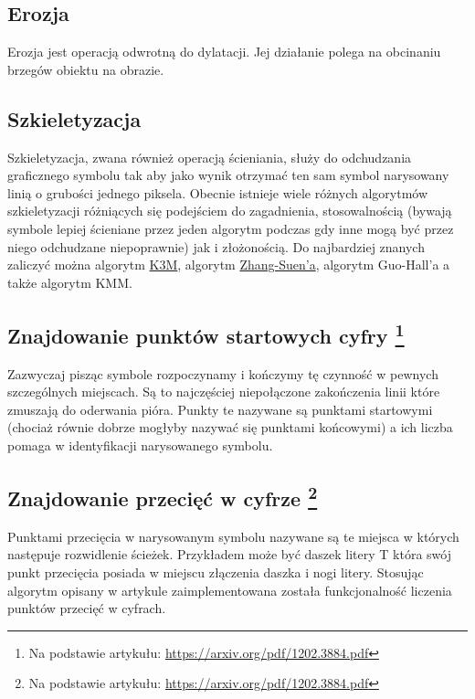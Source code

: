 \documentclass{article}
\begin{document}
\subsection{Erozja}
Erozja jest operacją odwrotną do dylatacji. Jej działanie polega na obcinaniu brzegów obiektu na obrazie.

\subsection{Szkieletyzacja}
Szkieletyzacja, zwana również operacją ścieniania, służy do odchudzania graficznego symbolu tak aby jako wynik otrzymać ten sam symbol narysowany linią o grubości jednego piksela. Obecnie istnieje wiele różnych algorytmów szkieletyzacji różniących się podejściem do zagadnienia, stosowalnością (bywają symbole lepiej ścieniane przez jeden algorytm podczas gdy inne mogą być przez niego odchudzane niepoprawnie) jak i złożonością. Do najbardziej znanych zaliczyć można algorytm \href{http://matwbn.icm.edu.pl/ksiazki/amc/amc20/amc2029.pdf}{K3M}, algorytm \href{https://rosettacode.org/wiki/Zhang-Suen_thinning_algorithm}{Zhang-Suen'a}, algorytm Guo-Hall’a a także algorytm KMM.

\subsection{Znajdowanie punktów startowych cyfry \protect\footnote{Na podstawie artykułu: \href{https://arxiv.org/pdf/1202.3884.pdf}{https://arxiv.org/pdf/1202.3884.pdf} } }
Zazwyczaj pisząc symbole rozpoczynamy i kończymy tę czynność w pewnych szczególnych miejscach. Są to najczęściej niepołączone zakończenia linii które zmuszają do oderwania pióra. Punkty te nazywane są punktami startowymi (chociaż równie dobrze mogłyby nazywać się punktami końcowymi) a ich liczba pomaga w identyfikacji narysowanego symbolu.

\subsection{Znajdowanie przecięć w cyfrze \protect\footnote{Na podstawie artykułu: \href{https://arxiv.org/pdf/1202.3884.pdf}{https://arxiv.org/pdf/1202.3884.pdf} } }
Punktami przecięcia w narysowanym symbolu nazywane są te miejsca w których następuje rozwidlenie ścieżek. Przykładem może być daszek litery T która swój punkt przecięcia posiada w miejscu złączenia daszka i nogi litery. Stosując algorytm opisany w artykule zaimplementowana została funkcjonalność liczenia punktów przecięć w cyfrach.
\end{document}
